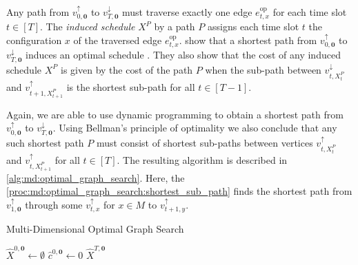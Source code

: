 Any path from $v_{0,\mathbf{0}}^{\uparrow}$ to $v_{T,\mathbf{0}}^{\downarrow}$ must traverse exactly one edge $e_{t,x}^{\text{op}}$ for each time slot $t \in [T]$. The \textit{induced schedule} $X^P$ by a path $P$ assigns each time slot $t$ the configuration $x$ of the traversed edge $e_{t,x}^{\text{op}}$. \citeauthor*{Albers2021_2} show that a shortest path from $v_{0,\mathbf{0}}^{\uparrow}$ to $v_{T,\mathbf{0}}^{\downarrow}$ induces an optimal schedule \cite{Albers2021_2}. They also show that the cost of any induced schedule $X^P$ is given by the cost of the path $P$ when the sub-path between $v_{t,X_t^P}^{\downarrow}$ and $v_{t+1,X_{t+1}^P}^{\uparrow}$ is the shortest sub-path for all $t \in [T-1]$.

Again, we are able to use dynamic programming to obtain a shortest path from $v_{0,\mathbf{0}}^{\uparrow}$ to $v_{T,\mathbf{0}}^{\downarrow}$. Using Bellman's principle of optimality we also conclude that any such shortest path $P$ must consist of shortest sub-paths between vertices $v_{t,X_t^P}^{\uparrow}$ and $v_{t,X_{t+1}^P}^{\uparrow}$ for all $t \in [T]$. The resulting algorithm is described in \autoref{alg:md:optimal_graph_search}. Here, the \autoref{proc:md:optimal_graph_search:shortest_sub_path} finds the shortest path from $v_{1,\mathbf{0}}^{\uparrow}$ through some $v_{t,x}^{\uparrow}$ for $x \in M$ to $v_{t+1,y}^{\uparrow}$.

\begin{algorithm}
    \caption{Multi-Dimensional Optimal Graph Search \cite{Albers2021_2}}\label{alg:md:optimal_graph_search}
    $\hat{X}^{0,\mathbf{0}} \gets \emptyset$\;
    $\hat{c}^{0,\mathbf{0}} \gets 0$\;
    \Return $\hat{X}^{T,\mathbf{0}}$\;
\end{algorithm}

